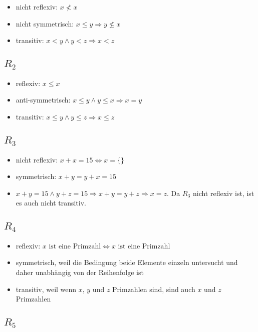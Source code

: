 \documentclass[a4paper,10pt]{article}
\begin{document}
\begin{itemize}
 \item nicht reflexiv: $x \not< x$
 \item nicht symmetrisch: $x \le y \Rightarrow y \nleq x$
 \item transitiv: $x < y \land y < z \Rightarrow x < z$
\end{itemize}

\subsection*{$R_2$}

\begin{itemize}
 \item reflexiv: $x \le x$
 \item anti-symmetrisch: $x \le y \land y \le x \Rightarrow x = y$
 \item transitiv: $x \le y \land y \le z \Rightarrow x \le z$
\end{itemize}

\subsection*{$R_3$}

\begin{itemize}
 \item nicht reflexiv: $x + x = 15 \Leftrightarrow x = \{\}$
 \item symmetrisch: $x + y = y + x = 15$
 \item $x + y = 15 \land y + z = 15 \Rightarrow x + y = y + z \Rightarrow x = z$. Da $R_3$ nicht reflexiv ist, ist es auch nicht transitiv.
\end{itemize}

\subsection*{$R_4$}

\begin{itemize}
 \item reflexiv: $x \text{ ist eine Primzahl} \Leftrightarrow x \text{ ist eine Primzahl}$
 \item symmetrisch, weil die Bedingung beide Elemente einzeln untersucht und daher unabhängig von der Reihenfolge ist
 \item transitiv, weil wenn $x$, $y$ und $z$ Primzahlen sind, sind auch $x$ und $z$ Primzahlen
\end{itemize}

\subsection*{$R_5$}
\end{document}
